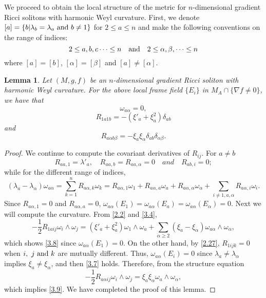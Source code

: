 \documentclass{amsart}
\newtheorem{lemma}[theorem]{Lemma}
\theoremstyle{definition}
\theoremstyle{remark}
\numberwithin{equation}{section}
\begin{document}
	We proceed to obtain the local structure of the metric for $n$-dimensional gradient Ricci solitons with harmonic Weyl curvature.
	First, we denote $[a]=\{b| \lambda_{b}=\lambda_{a}~ {\rm and } ~ b \neq1\}$ for $2\leq a\leq n$
	and make the following conventions on the range of indices:
	\[
	2 \leq a, b, c \cdots\leq n  \quad {\rm and} \quad  2 \leq \alpha, \beta,  \cdots\leq n
	\]
	where $[a]=[b]$, $[\alpha]=[\beta]$ and $[a]\neq[\alpha]$.
		\begin{lemma} \label{lemma3.3-}
		Let $(M, g, f)$ be an $n$-dimensional gradient Ricci soliton  with harmonic Weyl curvature.
		For the above local frame field $\{ E_i \}$ in $M_{A} \cap \{ \nabla f \neq 0 \}$,
		we have that
		\begin{equation}\label{3.7}
		\omega_{a\alpha}=0,
		\end{equation}
		\begin{equation}\label{3.8}
		R_{1a1b}=-\left( \xi'_a+\xi^2_a\right) \delta_{ab}
		\end{equation}
    and 
		\begin{equation}\label{3.9}
		R_{a\alpha b \beta}=-\xi_a\xi_\alpha \delta_{ab}\delta_{\alpha\beta}.
		\end{equation}
	\end{lemma}

	\begin{proof}	
		We continue to compute the covariant derivatives of $R_{ij}$.
	For $a\neq b$
   \[
	R_{aa,1}=\lambda'_a,  \quad R_{aa,b}=R_{aa,\alpha}=0 \quad  and \quad R_{ab,i}=0;
   \]
	while for the different range of indices, 
	\[
		\left(\lambda_a-\lambda_\alpha \right)\omega_{a\alpha}
	= \sum_{k=1}^{n}R_{a\alpha,k}\omega_k 
	= R_{a\alpha,1}\omega_1+R_{a\alpha,a}\omega_a+R_{a\alpha,\alpha}\omega_\alpha
	+\sum_{i\neq 1,a,\alpha}R_{a\alpha,i}\omega_i.
	\]
	Since $R_{a\alpha,1}=0$ and $R_{a\alpha,a}=0$,
     $\omega_{a\alpha}(E_1)= \omega_{a\alpha}(E_a)=\omega_{a\alpha}(E_\alpha)=0$.
	Next we will compute the curvature. From  \eqref{2.2} and \eqref{3.4},
	\[
	-\frac{1}{2}R_{1aij}\omega_{i}\wedge\omega_{j}=\left(\xi'_a+\xi^2_a \right)\omega_{1}\wedge\omega_{a}
	+ \sum_{\alpha\geq 2}\left(\xi_a-\xi_\alpha \right)\omega_{a\alpha}\wedge\omega_{\alpha},
	\]
	which shows \eqref{3.8} since $\omega_{a\alpha}(E_1)=0$.
	On the other hand, by \eqref{2.27}, $R_{1ijk}=0$
	when $i,~ j~ {\rm and }~ k $ are mutually different. 
	Thus, $\omega_{a\alpha}(E_i)=0$ since $\lambda_a \neq \lambda_\alpha$ implies $\xi_a\neq\xi_\alpha$,
	and then \eqref{3.7} holds.
	Therefore, from the structure equation
	\[
		-\frac{1}{2}R_{a\alpha ij}\omega_{i}\wedge\omega_{j}=\xi_a\xi_\alpha \omega_{a}\wedge\omega_{\alpha},
	\]
	which implies \eqref{3.9}. We have completed the proof of this lemma.
    \end{proof}
	
\end{document}
